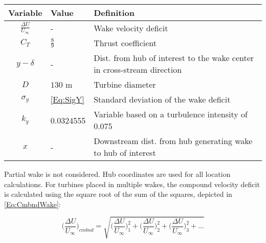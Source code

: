 \documentclass[12pt]{article}
\begin{document}
    \begin{table}[H]
        \centering
        \begin{tabular}{|c|l|l|}
            \hline
             Variable & Value & Definition \\ \hline
            $\frac{\Delta U}{U_{\infty}}$ & - & Wake velocity deficit \\ \hline
            $C_T$ & $\frac{8}{9}$ & Thrust coefficient \\ \hline
            $y-\delta$ & - & Dist. from hub of interest to the wake center in cross-stream direction \\ \hline
            $D$ & $130$ m & Turbine diameter \\ \hline
            $\sigma_y$ & \cref{Eq:SigY} & Standard deviation of the wake deficit \\ \hline
            $k_y$ & 0.0324555 & Variable based on a turbulence intensity of 0.075 \cite{Thomas2018, Niayifar2016} \\ \hline
            $x$ & - & Downstream dist. from hub generating wake to hub of interest \\ \hline
        \end{tabular}
    \end{table}
\vspace{-0.25cm}
    Partial wake is not considered. Hub coordinates are used for all location calculations. For turbines placed in multiple wakes, the compound velocity deficit is calculated using the square root of the sum of the squares, depicted in \cref{Eq:CmbndWake}:
    
    \begin{equation}
    \label{Eq:CmbndWake}
        \bigg(\frac{\Delta U}{U_{\infty}}\bigg)_{cmbnd} = 
            \sqrt{
                \bigg(\frac{\Delta U}{U_{\infty}}\bigg)_{1}^{2} +
                \bigg(\frac{\Delta U}{U_{\infty}}\bigg)_{2}^{2} +
                \bigg(\frac{\Delta U}{U_{\infty}}\bigg)_{3}^{2} +
                \dots}
    \end{equation}



\end{document}
